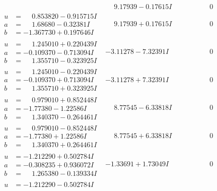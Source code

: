 \documentclass[1p]{elsarticle_modified}
\theoremstyle{definition}
\begin{document}
$$\begin{array}{c|c|c}
 & \phantom{-}9.17939 - 0.17615 I & \phantom{-0.000000 } 0 \\ \hline\begin{aligned}
u &= \phantom{-}0.853820 - 0.915715 I \\
a &= \phantom{-}1.68680 - 0.32381 I \\
b &= -1.367730 + 0.197646 I\end{aligned}
 & \phantom{-}9.17939 + 0.17615 I & \phantom{-0.000000 } 0 \\ \hline\begin{aligned}
u &= \phantom{-}1.245010 + 0.220439 I \\
a &= -0.109370 - 0.713094 I \\
b &= \phantom{-}1.355710 - 0.323925 I\end{aligned}
 & -3.11278 - 7.32391 I & \phantom{-0.000000 } 0 \\ \hline\begin{aligned}
u &= \phantom{-}1.245010 - 0.220439 I \\
a &= -0.109370 + 0.713094 I \\
b &= \phantom{-}1.355710 + 0.323925 I\end{aligned}
 & -3.11278 + 7.32391 I & \phantom{-0.000000 } 0 \\ \hline\begin{aligned}
u &= \phantom{-}0.979010 + 0.852448 I \\
a &= -1.77380 - 1.22586 I \\
b &= \phantom{-}1.340370 - 0.264461 I\end{aligned}
 & \phantom{-}8.77545 - 6.33818 I & \phantom{-0.000000 } 0 \\ \hline\begin{aligned}
u &= \phantom{-}0.979010 - 0.852448 I \\
a &= -1.77380 + 1.22586 I \\
b &= \phantom{-}1.340370 + 0.264461 I\end{aligned}
 & \phantom{-}8.77545 + 6.33818 I & \phantom{-0.000000 } 0 \\ \hline\begin{aligned}
u &= -1.212290 + 0.502784 I \\
a &= -0.308235 + 0.936072 I \\
b &= \phantom{-}1.265380 - 0.139334 I\end{aligned}
 & -1.33691 + 1.73049 I & \phantom{-0.000000 } 0 \\ \hline\begin{aligned}
u &= -1.212290 - 0.502784 I \\

\end{aligned}
\end{array}$$
\end{document}
